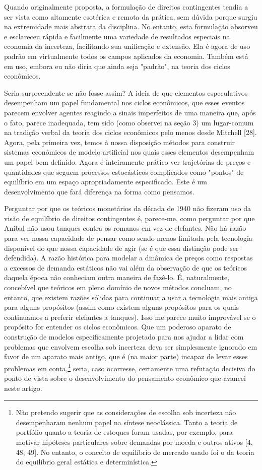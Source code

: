 \documentclass[12pt]{article}
\begin{document}
Quando originalmente proposta, a formulação de direitos contingentes tendia a ser vista como altamente esotérica e remota da prática, sem dúvida porque surgiu na extremidade mais abstrata da disciplina. No entanto, esta formulação absorveu e esclareceu rápida e facilmente uma variedade de resultados especiais na economia da incerteza, facilitando sua unificação e extensão. Ela é agora de uso padrão em virtualmente todos os campos aplicados da economia. Também está em uso, embora eu não diria que ainda seja "padrão", na teoria dos ciclos econômicos.

Seria surpreendente se não fosse assim? A ideia de que elementos especulativos desempenham um papel fundamental nos ciclos econômicos, que esses eventos parecem envolver agentes reagindo a sinais imperfeitos de uma maneira que, após o fato, parece inadequada, tem sido (como observei na seção 3) um lugar-comum na tradição verbal da teoria dos ciclos econômicos pelo menos desde Mitchell [28]. Agora, pela primeira vez, temos à nossa disposição métodos para construir sistemas econômicos de modelo artificial nos quais esses elementos desempenham um papel bem definido. Agora é inteiramente prático ver trajetórias de preços e quantidades que seguem processos estocásticos complicados como "pontos" de equilíbrio em um espaço apropriadamente especificado. Este é um desenvolvimento que fará diferença na forma como pensamos.

Perguntar por que os teóricos monetários da década de 1940 não fizeram uso da visão de equilíbrio de direitos contingentes é, parece-me, como perguntar por que Aníbal não usou tanques contra os romanos em vez de elefantes. Não há razão para ver nossa capacidade de pensar como sendo menos limitada pela tecnologia disponível do que nossa capacidade de agir (se é que essa distinção pode ser defendida). A razão histórica para modelar a dinâmica de preços como respostas a excessos de demanda estáticos não vai além da observação de que os teóricos daquela época não conheciam outra maneira de fazê-lo. É, naturalmente, concebível que teóricos em pleno domínio de novos métodos concluam, no entanto, que existem razões sólidas para continuar a usar a tecnologia mais antiga para alguns propósitos (assim como existem alguns propósitos para os quais continuamos a preferir elefantes a tanques). Isso me parece muito improvável se o propósito for entender os ciclos econômicos. Que um poderoso aparato de construção de modelos especificamente projetado para nos ajudar a lidar com problemas que envolvem escolha sob incerteza deva ser simplesmente ignorado em favor de um aparato mais antigo, que é (na maior parte) incapaz de levar esses problemas em conta,\footnote{Não pretendo sugerir que as considerações de escolha sob incerteza não desempenharam nenhum papel na síntese neoclássica. Tanto a teoria de portfólio quanto a teoria de estoques foram usadas, por exemplo, para motivar hipóteses particulares sobre demandas por moeda e outros ativos [4, 48, 49]. No entanto, o conceito de equilíbrio de mercado usado foi o da teoria do equilíbrio geral estática e determinística.} seria, caso ocorresse, certamente uma refutação decisiva do ponto de vista sobre o desenvolvimento do pensamento econômico que avancei neste artigo.
\end{document}
